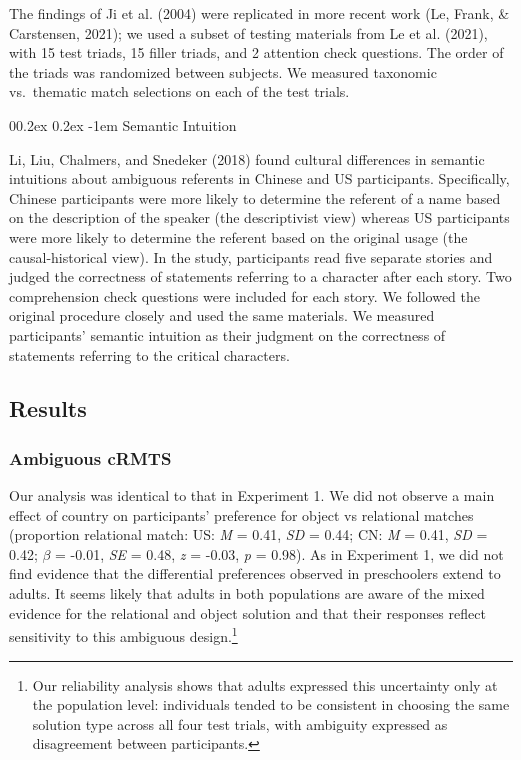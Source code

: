 \documentclass[
  man,floatsintext]{apa6}
\makeatletter
\let\oldparagraph\paragraph
\renewcommand{\paragraph}[1]{\oldparagraph{#1}\mbox{}}
\renewcommand{\paragraph}{\@startsection{paragraph}{4}{\parindent}%
  {0\baselineskip \@plus 0.2ex \@minus 0.2ex}%
  {-1em}%
  {\normalfont\normalsize\bfseries\itshape\typesectitle}}
\makeatother
\begin{document}
The findings of Ji et al. (2004) were replicated in more recent work (Le, Frank, \& Carstensen, 2021); we used a subset of testing materials from Le et al. (2021), with 15 test triads, 15 filler triads, and 2 attention check questions. The order of the triads was randomized between subjects. We measured taxonomic vs.~thematic match selections on each of the test trials.

\hypertarget{semantic-intuition}{%
\paragraph{Semantic Intuition}\label{semantic-intuition}}

Li, Liu, Chalmers, and Snedeker (2018) found cultural differences in semantic intuitions about ambiguous referents in Chinese and US participants. Specifically, Chinese participants were more likely to determine the referent of a name based on the description of the speaker (the descriptivist view) whereas US participants were more likely to determine the referent based on the original usage (the causal-historical view). In the study, participants read five separate stories and judged the correctness of statements referring to a character after each story. Two comprehension check questions were included for each story. We followed the original procedure closely and used the same materials. We measured participants' semantic intuition as their judgment on the correctness of statements referring to the critical characters.

\hypertarget{results-1}{%
\subsection{Results}\label{results-1}}

\hypertarget{ambiguous-crmts-2}{%
\subsubsection{Ambiguous cRMTS}\label{ambiguous-crmts-2}}

Our analysis was identical to that in Experiment 1. We did not observe a main effect of country on participants' preference for object vs relational matches (proportion relational match: US: \emph{M} = 0.41, \emph{SD} = 0.44; CN: \emph{M} = 0.41, \emph{SD} = 0.42; \(\beta\) = -0.01, \emph{SE} = 0.48, \emph{z} = -0.03, \emph{p} = 0.98). As in Experiment 1, we did not find evidence that the differential preferences observed in preschoolers extend to adults. It seems likely that adults in both populations are aware of the mixed evidence for the relational and object solution and that their responses reflect sensitivity to this ambiguous design.\footnote{Our reliability analysis shows that adults expressed this uncertainty only at the population level: individuals tended to be consistent in choosing the same solution type across all four test trials, with ambiguity expressed as disagreement between participants.}
\end{document}
